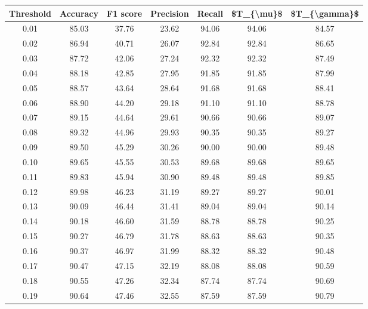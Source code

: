 \begin{tabular}{|c|c|c|c|c|c|c|}
\hline
 Threshold &  Accuracy &  F1 score &  Precision &  Recall &  \$T\_\{\textbackslash mu\}\$ &  \$T\_\{\textbackslash gamma\}\$ \\
\hline
      0.01 &     85.03 &     37.76 &      23.62 &   94.06 &      94.06 &         84.57 \\
      0.02 &     86.94 &     40.71 &      26.07 &   92.84 &      92.84 &         86.65 \\
      0.03 &     87.72 &     42.06 &      27.24 &   92.32 &      92.32 &         87.49 \\
      0.04 &     88.18 &     42.85 &      27.95 &   91.85 &      91.85 &         87.99 \\
      0.05 &     88.57 &     43.64 &      28.64 &   91.68 &      91.68 &         88.41 \\
      0.06 &     88.90 &     44.20 &      29.18 &   91.10 &      91.10 &         88.78 \\
      0.07 &     89.15 &     44.64 &      29.61 &   90.66 &      90.66 &         89.07 \\
      0.08 &     89.32 &     44.96 &      29.93 &   90.35 &      90.35 &         89.27 \\
      0.09 &     89.50 &     45.29 &      30.26 &   90.00 &      90.00 &         89.48 \\
      0.10 &     89.65 &     45.55 &      30.53 &   89.68 &      89.68 &         89.65 \\
      0.11 &     89.83 &     45.94 &      30.90 &   89.48 &      89.48 &         89.85 \\
      0.12 &     89.98 &     46.23 &      31.19 &   89.27 &      89.27 &         90.01 \\
      0.13 &     90.09 &     46.44 &      31.41 &   89.04 &      89.04 &         90.14 \\
      0.14 &     90.18 &     46.60 &      31.59 &   88.78 &      88.78 &         90.25 \\
      0.15 &     90.27 &     46.79 &      31.78 &   88.63 &      88.63 &         90.35 \\
      0.16 &     90.37 &     46.97 &      31.99 &   88.32 &      88.32 &         90.48 \\
      0.17 &     90.47 &     47.15 &      32.19 &   88.08 &      88.08 &         90.59 \\
      0.18 &     90.55 &     47.26 &      32.34 &   87.74 &      87.74 &         90.69 \\
      0.19 &     90.64 &     47.46 &      32.55 &   87.59 &      87.59 &         90.79 \\

\end{tabular}
